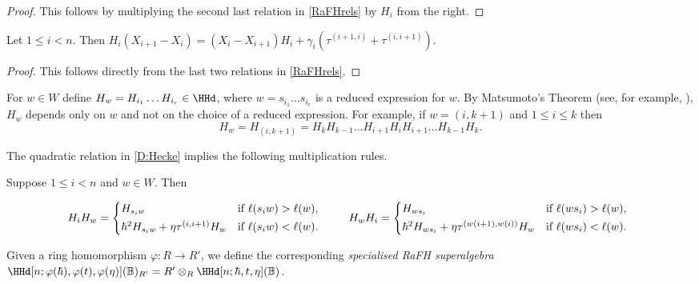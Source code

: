 \documentclass[a4paper,11pt]{amsart}
\numberwithin{equation}{subsection}
\theoremstyle{definition}
\theoremstyle{theorem}
\theoremstyle{remark}
\newcommand\Sym{W}
\newcommand\taui[1][i]{\tau^{(#1)}}
\newcommand{\Bo}{\mathbb{B}}
\begin{document}
\begin{proof}
  This follows by multiplying the second last relation in \autoref{RaFHrels} by $H_i$ from the right.
\end{proof}

\begin{Lemma}\label{Halpha}
Let $1\le i<n$. Then $H_i(X_{i+1}-X_i)=(X_i-X_{i+1})H_i+\gamma_i(\tau^{(i+1,i)}+\tau^{(i,i+1)})$.
\end{Lemma}
\begin{proof}
This follows directly from the last two relations in \autoref{RaFHrels}.
\end{proof}

  For $w\in\Sym$ define $H_w=H_{i_1}\dots H_{i_r}\in\HHd$, where
  $w=s_{i_1}\dots s_{i_r}$ is a reduced expression for $w$. By
  Matsumoto's Theorem (see, for example, \cite[Theorem~1.8]{Mathas:ULect}), $H_w$ depends only on $w$ and not
  on the choice of a reduced expression. For example, if $w=(i,k+1)$ and $1\leq i\leq k$ then
  \begin{equation}\label{Htranspo}
  H_w=H_{(i,k+1)}=H_kH_{k-1}\ldots H_{i+1}H_iH_{i+1}\ldots H_{k-1}H_k.
  \end{equation}


The quadratic relation in \autoref{D:Hecke} implies the following multiplication rules.

\begin{Lemma}\label{L:HiHw}
   Suppose $1\le i<n$ and $w\in\Sym$. Then
    \begin{small}
    \begin{equation*}
   H_iH_w = \begin{cases*}
     H_{s_iw} & if $\ell(s_iw)>\ell(w)$,\\
     \hbar^2H_{s_iw} +\eta\taui[i,i+1] H_w & if $\ell(s_iw)<\ell(w)$.
   \end{cases*}\quad\text{}\quad
   H_wH_i = \begin{cases*}
     H_{ws_i} & if $\ell(ws_i)>\ell(w)$,\\
     \hbar^2H_{ws_i} +\eta\taui[w(i+1),w(i)] H_w & if $\ell(ws_i)<\ell(w)$.
   \end{cases*}
   \end{equation*}
    \end{small}
     \end{Lemma}
\begin{Definition}\label{specialisation}
Given a ring homomorphism $\varphi\colon R\rightarrow R'$, we define the
corresponding \emph{specialised RaFH superalgebra}
$\HHd[n;\varphi(\hbar), \varphi(t), \varphi(\eta)](\Bo)_{R'}
  =R'\otimes_R\HHd[n;\hbar, t, \eta](\Bo)$.
\end{Definition}
\end{document}
